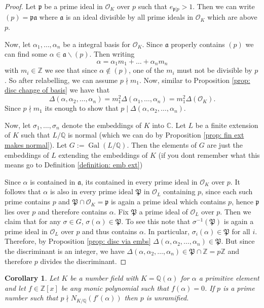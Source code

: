 \documentclass[11pt,a4paper]{report}
\theoremstyle{plain}
\newtheorem{cor}[subsection]{Corollary}
\theoremstyle{definition}
\theoremstyle{definition}
\newcommand{\ZZ}{\mathbb{Z}}
\def\CC{\mathbb{C}}
\def\QQ{\mathbb{Q}}
\def \gothP{\mathfrak{P}}
\def\gothp{\mathfrak{p}}
\def \a{\alpha}
\def \s {\sigma}
\def \OO {\mathcal{O}}
\def \s {\sigma}
\def\gotha{\mathfrak{a}}
\DeclareMathOperator{\Gal}{Gal}
\begin{document}
	\begin{proof}
		Let $\gothp$ be a prime ideal in $\OO_K$ over $p$ such that $e_{\gothp|p}>1$. Then we can write $(p)=\gothp \gotha$ where $\gotha$ is an ideal divisible by all prime ideals in $\OO_K$ which are above $p$. 
		
		Now, let $\a_1,\dots,\a_n$ be  a integral basis for $\OO_K$. Since $\gotha$ properly contains $(p)$ we can find some $\a \in \gotha \backslash (p)$. Then writing \[\a=\a_1m_1+\dots+\a_nm_n\] with $m_i \in \ZZ$ we see that since $\a \not \in (p)$, one of the $m_i$ must not be divisible by $p$. So after relabelling, we can assume $p \nmid m_1$. Now, similar to Proposition \ref{prop: disc change of basis} we have that \[\Delta(\a,\a_2,\dots,\a_n)=m_1^2 \Delta(\a_1,\dots,\a_n)=m_1^2\Delta(\OO_K).\] Since $p \nmid m_1$ its enough to show that $p \mid \Delta(\a,\a_2,\dots,\a_n)$.
		
		Now, let $\s_1,\dots,\s_n$ denote the embeddings of $K$ into $\CC$. Let $L$ be a finite extension of $K$ such that $L/\QQ$ is normal (which we can do by Proposition \ref{prop: fin ext makes normal}). Let $G:=\Gal(L/\QQ)$. Then the elements of $G$ are just the embeddings of $L$ extending the embeddings of $K$ (if you dont remember what this means go to Definition \ref{definition: emb ext})
		
		Since $\a$ is contained in $\gotha$, its contained in every prime ideal in $\OO_K$ over $p$. It follows that $\a$ is also in every prime ideal $\gothP$ in $\OO_L$ containing $p$, since each such prime contains $p$ and $\gothP \cap \OO_K=\gothp$ is again a prime ideal which contains $p$, hence $\gothp$ lies over $p$ and therefore contains $\a$. Fix $\gothP$ a prime ideal of $\OO_L$ over $p$. Then we claim that for any $\s \in G$, $\s(\a) \in \gothP$. To see this note that $\s^{-1}(\gothP)$ is again a prime ideal in $\OO_L$ over $p$ and thus contains $\a$. In particular, $\s_i(\a) \in \gothP$ for all $i$. Therefore, by Proposition \ref{prop: disc via embs} $\Delta(\a,\a_2,\dots,\a_n) \in \gothP$. But since the discriminant is an integer, we have $\Delta(\a,\a_2,\dots,\a_n) \in \gothP \cap \ZZ=p\ZZ$ and therefore $p$ divides the discriminant.
		
	\end{proof}
	
	\begin{cor}\label{cor: p unram if norm of blah}
		Let $K$ be a number field with $K=\QQ(\a)$ for $\a$ a primitive element and let $f \in \ZZ[x]$ be any monic polynomial such that $f(\a)=0$. If $p$ is a prime number such that $p \nmid N_{K/\QQ}(f'(\a))$ then $p$ is unramified.
	\end{cor}
	
\end{document}
